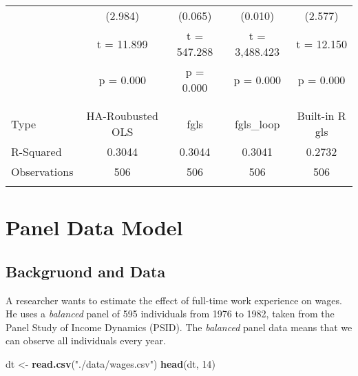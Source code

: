\documentclass[
  12pt,
]{article}
\newenvironment{Shaded}{\begin{snugshade}}{\end{snugshade}}
\newcommand{\DecValTok}[1]{\textcolor[rgb]{0.00,0.00,0.81}{#1}}
\newcommand{\KeywordTok}[1]{\textcolor[rgb]{0.13,0.29,0.53}{\textbf{#1}}}
\newcommand{\NormalTok}[1]{#1}
\newcommand{\StringTok}[1]{\textcolor[rgb]{0.31,0.60,0.02}{#1}}
\begin{document}
\begin{table}[htb]
\begin{tabular}{@{\extracolsep{5pt}}lcccc}
        & (2.984) & (0.065) & (0.010) & (2.577) \\ 
        & t = 11.899 & t = 547.288 & t = 3,488.423 & t = 12.150 \\ 
        & p = 0.000 & p = 0.000 & p = 0.000 & p = 0.000 \\ 
        & & & & \\ 
        \hline \\[-1.8ex] 
        Type & HA-Roubusted OLS & fgls & fgls\_loop & Built-in R gls \\ 
        R-Squared & 0.3044 & 0.3044 & 0.3041 & 0.2732 \\ 
        Observations & 506 & 506 & 506 & 506 \\ 
        \hline 
        \hline \\[-1.8ex] 
    \end{tabular} 
\end{table}

\hypertarget{panel-data-model}{%
\section{Panel Data Model}\label{panel-data-model}}

\hypertarget{backgruond-and-data}{%
\subsection{Backgruond and Data}\label{backgruond-and-data}}

A researcher wants to estimate the effect of full-time work experience on wages.
He uses a \emph{balanced} panel of 595 individuals from 1976 to 1982, taken from the Panel Study of Income Dynamics (PSID).
The \emph{balanced} panel data means that we can observe all individuals every year.

\begin{Shaded}
\begin{Highlighting}[]
\NormalTok{dt \textless{}{-}}\StringTok{ }\KeywordTok{read.csv}\NormalTok{(}\StringTok{"./data/wages.csv"}\NormalTok{)}
\KeywordTok{head}\NormalTok{(dt, }\DecValTok{14}\NormalTok{)}
\end{Highlighting}
\end{Shaded}
\end{document}
